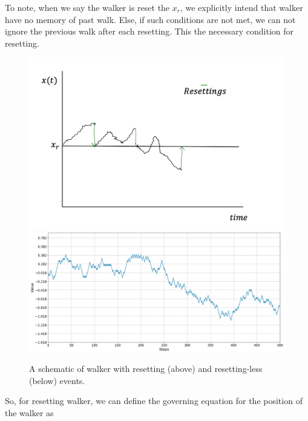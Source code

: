 \documentclass[showpacs,amsmath,amssymb,aps,pre,twocolumn]{revtex4-1}
\begin{document}
To note, when we say the walker is reset the $x_r$, we explicitly intend that walker have no memory of past walk. Else, if such conditions are not met, we can not ignore the previous walk after each resetting. This the necessary condition for resetting.
\begin{figure}[H]
    \centering
    \includegraphics[scale=0.45]{resetting.png}
    \includegraphics[scale = 0.25]{steps.png}
    \caption{A schematic of walker with resetting (above) and resetting-less (below) events.}
    \label{fig:my_label}
\end{figure}

So, for resetting walker, we can define the governing equation for the position of the walker as
\end{document}
